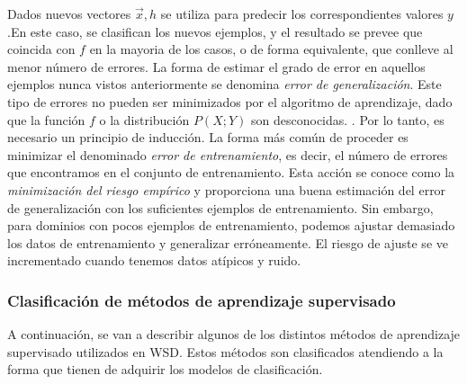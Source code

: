 Dados nuevos vectores $\vec{x},h$ se utiliza para predecir los correspondientes valores $y$.En este caso, se clasifican los nuevos ejemplos, y el resultado se prevee que coincida con $f$ en la mayoria de los casos, o de forma equivalente, que conlleve al menor número de errores. La forma de estimar el grado de error en aquellos ejemplos nunca vistos anteriormente se denomina \textit{error de generalización}. Este tipo de errores no pueden ser minimizados por el algoritmo de aprendizaje, dado que la función $f$ o la distribución $P(X;Y)$ son desconocidas. . Por lo tanto, es necesario un principio de inducción. La forma más común de proceder es minimizar el denominado \textit{error de entrenamiento}, es decir, el número de errores que encontramos en el conjunto de entrenamiento. Esta acción se conoce como la \textit{minimización del riesgo empírico} y proporciona una buena estimación del error de generalización con los suficientes ejemplos de entrenamiento. Sin embargo, para dominios con pocos ejemplos de entrenamiento, podemos ajustar demasiado los datos de entrenamiento y generalizar erróneamente. El riesgo de ajuste se ve incrementado cuando tenemos datos atípicos y ruido.

\subsubsection*{Clasificación de métodos de aprendizaje supervisado}

A continuación, se van a describir algunos de los distintos métodos de aprendizaje supervisado utilizados en WSD. Estos métodos son clasificados atendiendo a la forma que tienen de adquirir los modelos de clasificación.

